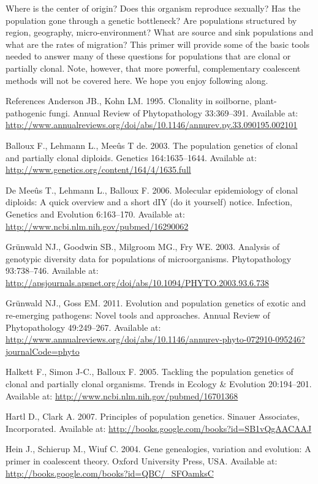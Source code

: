 \documentclass[12pt,]{krantz}
\theoremstyle{definition}
\theoremstyle{definition}
\theoremstyle{definition}
\theoremstyle{remark}
\begin{document}
Where is the center of origin? Does this organism reproduce sexually?
Has the population gone through a genetic bottleneck? Are populations
structured by region, geography, micro-environment? What are source and
sink populations and what are the rates of migration? This primer will
provide some of the basic tools needed to answer many of these questions
for populations that are clonal or partially clonal. Note, however, that
more powerful, complementary coalescent methods will not be covered
here. We hope you enjoy following along.

References Anderson JB., Kohn LM. 1995. Clonality in soilborne,
plant-pathogenic fungi. Annual Review of Phytopathology 33:369--391.
Available at:
\url{http://www.annualreviews.org/doi/abs/10.1146/annurev.py.33.090195.002101}

Balloux F., Lehmann L., Meeûs T de. 2003. The population genetics of
clonal and partially clonal diploids. Genetics 164:1635--1644. Available
at: \url{http://www.genetics.org/content/164/4/1635.full}

De Meeûs T., Lehmann L., Balloux F. 2006. Molecular epidemiology of
clonal diploids: A quick overview and a short dIY (do it yourself)
notice. Infection, Genetics and Evolution 6:163--170. Available at:
\url{http://www.ncbi.nlm.nih.gov/pubmed/16290062}

Grünwald NJ., Goodwin SB., Milgroom MG., Fry WE. 2003. Analysis of
genotypic diversity data for populations of microorganisms.
Phytopathology 93:738--746. Available at:
\url{http://apsjournals.apsnet.org/doi/abs/10.1094/PHYTO.2003.93.6.738}

Grünwald NJ., Goss EM. 2011. Evolution and population genetics of exotic
and re-emerging pathogens: Novel tools and approaches. Annual Review of
Phytopathology 49:249--267. Available at:
\url{http://www.annualreviews.org/doi/abs/10.1146/annurev-phyto-072910-095246?journalCode=phyto}

Halkett F., Simon J-C., Balloux F. 2005. Tackling the population
genetics of clonal and partially clonal organisms. Trends in Ecology \&
Evolution 20:194--201. Available at:
\url{http://www.ncbi.nlm.nih.gov/pubmed/16701368}

Hartl D., Clark A. 2007. Principles of population genetics. Sinauer
Associates, Incorporated. Available at:
\url{http://books.google.com/books?id=SB1vQgAACAAJ}

Hein J., Schierup M., Wiuf C. 2004. Gene genealogies, variation and
evolution: A primer in coalescent theory. Oxford University Press, USA.
Available at: \url{http://books.google.com/books?id=QBC/_SFOamksC}
\end{document}
